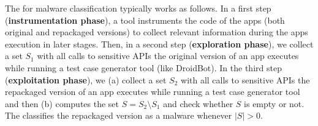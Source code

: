 The \mas for malware classification typically works as follows. In a first step ({\bf instrumentation phase}), 
a tool instruments the code of the apps (both original and repackaged versions) to collect relevant information
during the apps execution in later stages. Then, in a second step ({\bf exploration phase}),
we collect a set $S_1$ with all calls to sensitive APIs the original version of an app executes while running a test case generator tool (like DroidBot).
In the third step ({\bf exploitation phase}), we (a) collect a set $S_2$ with all calls to sensitive APIs the repackaged version of an app
executes while running a test case generator tool and then (b) computes the set $S = S_2 \setminus S_1$ and check whether  $S$ is empty or not.
The \mas classifies the repackaged version as a malware whenever $|S| > 0$.  




